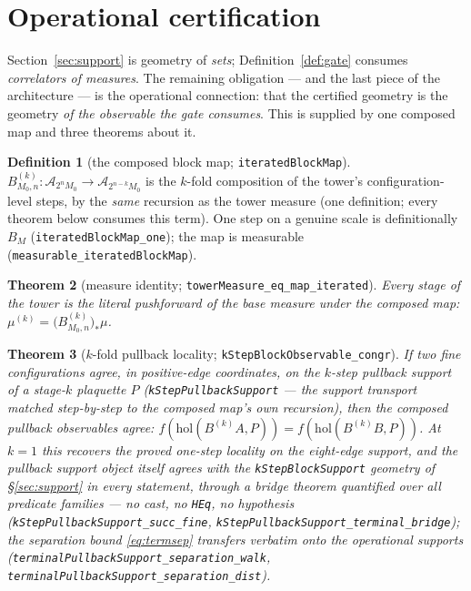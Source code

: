\documentclass[11pt]{article}
\newtheorem{theorem}{Theorem}[section]
\theoremstyle{definition}
\newtheorem{definition}[theorem]{Definition}
\newcommand{\lean}[1]{\texttt{#1}}
\newcommand{\Conf}[1]{\mathcal{A}_{#1}}
\newcommand{\holo}{\mathrm{hol}}
\begin{document}
\section{Operational certification}\label{sec:oper}

Section~\ref{sec:support} is geometry of \emph{sets};
Definition~\ref{def:gate} consumes \emph{correlators of measures}.
The remaining obligation --- and the last piece of the architecture
--- is the operational connection: that the certified geometry is the
geometry \emph{of the observable the gate consumes}.  This is supplied
by one composed map and three theorems about it.

\begin{definition}[the composed block map; \lean{iteratedBlockMap}]
$B^{(k)}_{M_0, n} : \Conf{2^n M_0} \to \Conf{2^{n-k} M_0}$ is the
$k$-fold composition of the tower's configuration-level steps, by the
\emph{same} recursion as the tower measure (one definition; every
theorem below consumes this term).  One step on a genuine scale is
definitionally $B_M$ (\lean{iteratedBlockMap\_one}); the map is
measurable (\lean{measurable\_iteratedBlockMap}).
\end{definition}

\begin{theorem}[measure identity;
\lean{towerMeasure\_eq\_map\_iterated}]\label{thm:measureid}
Every stage of the tower is the literal pushforward of the base
measure under the composed map:
$\mu^{(k)} = \bigl(B^{(k)}_{M_0, n}\bigr)_* \mu$.
\end{theorem}

\begin{theorem}[$k$-fold pullback locality;
\lean{kStepBlockObservable\_congr}]\label{thm:congr}
If two fine configurations agree, in positive-edge coordinates, on the
$k$-step pullback support of a stage-$k$ plaquette $P$
(\lean{kStepPullbackSupport} --- the support transport matched
step-by-step to the composed map's own recursion), then the composed
pullback observables agree:
$f(\holo(B^{(k)} A, P)) = f(\holo(B^{(k)} B, P))$.  At $k = 1$ this
recovers the proved one-step locality on the eight-edge support, and
the pullback support object itself agrees with the
\lean{kStepBlockSupport} geometry of \S\ref{sec:support} in every
statement, through a bridge theorem quantified over all predicate
families --- no cast, no \lean{HEq}, no hypothesis
(\lean{kStepPullbackSupport\_succ\_fine},
\lean{kStepPullbackSupport\_terminal\_bridge}); the separation bound
\eqref{eq:termsep} transfers verbatim onto the operational supports
(\lean{terminalPullbackSupport\_separation\_walk},
\lean{terminalPullbackSupport\_separation\_dist}).
\end{theorem}
\end{document}
